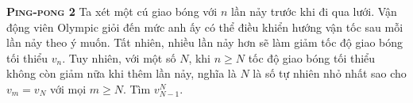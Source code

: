 
\begin{problem}{\textbf{\textsc{Ping-pong 2}}} Ta xét một cú giao bóng với $n$ lần nảy trước khi đi qua lưới. Vận động viên Olympic giỏi đến mức anh ấy có thể điều khiển hướng vận tốc sau mỗi lần nảy theo ý muốn. Tất nhiên, nhiều lần nảy hơn sẽ làm giảm tốc độ giao bóng tối thiểu $v_n$. Tuy nhiên, với một số $N$, khi $n\geq N$ tốc độ giao bóng tối thiểu không còn giảm nữa khi thêm lần nảy, nghĩa là $N$ là số tự nhiên nhỏ nhất sao cho $v_m=v_N$ với mọi $m\geq N.$ Tìm $v_{N-1}^N$.
	
\end{problem}